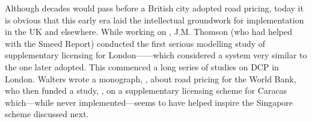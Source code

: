 Although decades would pass before a British city adopted road pricing, today it is obvious that this early era laid the intellectual groundwork for implementation in the UK and elsewhere. While working on \citet{MoT1967}, J.M. Thomson (who had helped with the Smeed Report) conducted the first serious modelling study of supplementary licensing for London---\citet{Thomson1967a}---which considered a system very similar to the one later adopted. This commenced a long series of studies on DCP in London. Walters wrote a monograph, \citet{Walters1968}, about road pricing for the World Bank, who then funded a study, \citet{Vorhees1973}, on a supplementary licensing scheme for Caracas which---while never implemented---seems to have helped inspire the Singapore scheme discussed next.

